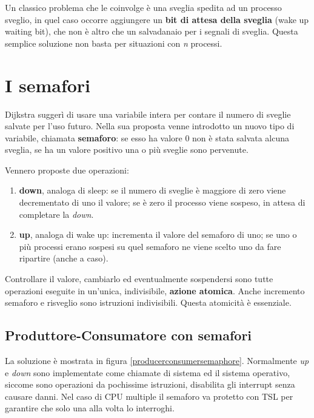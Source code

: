 Un classico problema che le coinvolge è una sveglia spedita ad un processo sveglio, in quel caso occorre aggiungere un \textbf{bit di attesa della sveglia} (wake up waiting bit), che non è altro che un salvadanaio per i segnali di sveglia. Questa semplice soluzione non basta per situazioni con \textit{n} processi.




\section{I semafori}
Dijkstra suggerì di usare una variabile intera per contare il numero di sveglie salvate per l'uso futuro. Nella sua proposta venne introdotto un nuovo tipo di variabile, chiamata \textbf{semaforo}: se esso ha valore 0 non è stata salvata alcuna sveglia, se ha un valore positivo una o più sveglie sono pervenute.

Vennero proposte due operazioni: 
\begin{enumerate}
    \item \textbf{down}, analoga di sleep: se il numero di sveglie è maggiore di zero viene decrementato di uno il valore; se è zero il processo viene sospeso, in attesa di completare la \textit{down}.
    \item \textbf{up}, analoga di wake up: incrementa il valore del semaforo di uno; se uno o più processi erano sospesi su quel semaforo ne viene scelto uno da fare ripartire (anche a caso).
\end{enumerate}

Controllare il valore, cambiarlo ed eventualmente sospendersi sono tutte operazioni eseguite in un'unica, indivisibile, \textbf{azione atomica}. Anche incremento semaforo e risveglio sono istruzioni indivisibili. Questa atomicità è essenziale.

\subsection{Produttore-Consumatore con semafori}

La soluzione è mostrata in figura \ref{producerconsumersemaphore}.
Normalmente \textit{up} e \textit{down} sono implementate come chiamate di sistema ed il sistema operativo, siccome sono operazioni da pochissime istruzioni, disabilita gli interrupt senza causare danni. Nel caso di CPU multiple il semaforo va protetto con TSL per garantire che solo una alla volta lo interroghi. 

